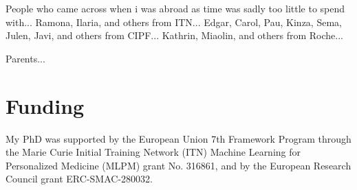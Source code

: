 People who came across when i was abroad as time was sadly too little to spend with... Ramona, Ilaria, and others from ITN... Edgar, Carol, Pau, Kinza, Sema, Julen, Javi, and others from CIPF... Kathrin, Miaolin, and others from Roche...


Parents...


\section*{Funding}

My PhD was supported by the European Union 7th Framework Program through the Marie Curie Initial Training Network (ITN) Machine Learning for Personalized Medicine (MLPM) grant No. 316861, and by the European Research Council grant ERC-SMAC-280032.
